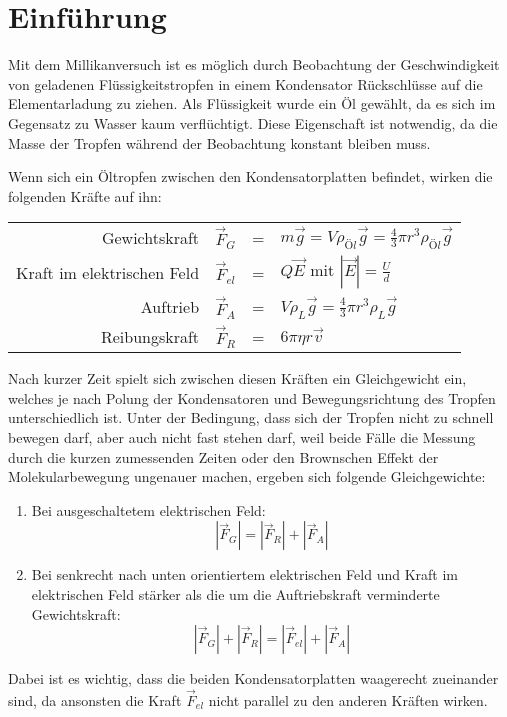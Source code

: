 \section{Einführung}
Mit dem Millikanversuch ist es möglich durch Beobachtung der Geschwindigkeit von geladenen Flüssigkeitstropfen in einem Kondensator Rückschlüsse auf die Elementarladung zu ziehen. Als Flüssigkeit wurde ein Öl gewählt, da es sich im Gegensatz zu Wasser kaum verflüchtigt. Diese Eigenschaft ist notwendig, da die Masse der Tropfen während der Beobachtung konstant bleiben muss.

Wenn sich ein Öltropfen zwischen den Kondensatorplatten befindet, wirken die folgenden Kräfte auf ihn:
\begin{table}[H]
	\centering
	\begin{tabular}{r c  c  l}
	Gewichtskraft & $\vec{F}_G$ & = & $m\vec{g}=V\rho_{Öl}\vec{g}=\frac{4}{3}\pi r^3 \rho_{Öl}\vec{g}$\\
	Kraft im elektrischen Feld & $\vec{F}_{el}$ & = & $Q\vec{E}$ mit $|\vec{E}|=\frac{U}{d}$\\
	Auftrieb & $\vec{F}_{A}$ & = & $V\rho_L\vec{g}=\frac{4}{3}\pi r^3 \rho_L\vec{g}$\\
	Reibungskraft & $\vec{F}_{R}$ & = & $6\pi \eta r\vec{v}$
	\end{tabular}
\end{table}
Nach kurzer Zeit spielt sich zwischen diesen Kräften ein Gleichgewicht ein, welches je nach Polung der Kondensatoren und Bewegungsrichtung des Tropfen unterschiedlich ist. Unter der Bedingung, dass sich der Tropfen nicht zu schnell bewegen darf, aber auch nicht fast stehen darf, weil beide Fälle die Messung durch die kurzen zumessenden Zeiten oder den Brownschen Effekt der Molekularbewegung ungenauer machen, ergeben sich folgende Gleichgewichte:
\begin{enumerate}
\item Bei ausgeschaltetem elektrischen Feld:
\begin{equation}
|\vec{F}_G|=|\vec{F}_R|+|\vec{F}_A|
\label{eq:keinfeld}
\end{equation}
\item Bei senkrecht nach unten orientiertem elektrischen Feld und Kraft im elektrischen Feld stärker als die um die Auftriebskraft verminderte Gewichtskraft:
\begin{equation}
|\vec{F}_G|+|\vec{F}_R|=|\vec{F}_{el}|+|\vec{F}_A|
\label{eq:mitfeld}
\end{equation}
\end{enumerate}
Dabei ist es wichtig, dass die beiden Kondensatorplatten waagerecht zueinander sind, da ansonsten die Kraft $\vec{F}_{el}$ nicht parallel zu den anderen Kräften wirken.

